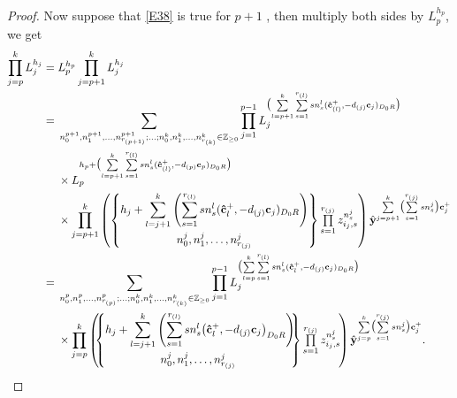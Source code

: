 \documentclass[pdftex]{sigma}
\newcommand{\Z}{\mathbb{Z}}
\numberwithin{equation}{section}
\begin{document}
\begin{proof}
 Now suppose that \eqref{E38} is true for $p+1$ , then multiply both sides by $L_p^{h_p}$, we get
 \begin{align*}
 \prod\limits_{j=p}^{k}L_j^{h_j}
 ={}&L_p^{h_p}\prod\limits_{j=p+1}^{k}L_j^{h_j} \\
={}&\sum_{n_0^{p+1},n_{1}^{p+1},\dots,n_{r_{(p+1)}}^{p+1};\dots;n_0^{k},n_{1}^{k},\dots,n_{r_{(k)}}^k\in \Z_{\geq 0} }\prod_{j=1}^{p-1}L_j^{\bigl(\sum\limits_{l=p+1}^{k}\sum\limits_{s=1}^{r_{(l)}}sn_{s}^{l}(\mathbf{\hat{c}}_{(l)}^+,-d_{(j)}\mathbf{c}_{j})_{D_0R}\bigr)} \\
&\times L_{p}^{h_{p}+\bigl(\sum\limits_{l=p+1}^{k}\sum\limits_{s=1}^{r_{(l)}}sn_{s}^{l}(\mathbf{\hat{c}}_{(l)}^+,-d_{(p)}\mathbf{c}_{p})_{D_0R}\bigr)} \\
&\times \prod\limits_{j=p+1}^{k}\begin{pmatrix}
 \begin{Bmatrix}\displaystyle h_j+\sum\limits_{l=j+1}^{k}\left(\sum\limits_{s=1}^{r_{(l)}}sn_{s}^{l}(\mathbf{\hat{c}}_{l}^+,-d_{(j)}\mathbf{c}_{j})_{D_0R}\right)\vspace{1mm}\\ n_0^j,n_{1}^j,\dots,n_{r_{(j)}}^j\end{Bmatrix}\prod\limits_{s=1}^{r_{(j)}}z_{i_j,s}^{n_s^j}
\end{pmatrix}\hat{\mathbf{y}}^{\sum\limits_{j=p+1}^{k}\bigl(\sum\limits_{s=1}^{r_{(j)}}sn_s^j\bigr)\mathbf{c}_{j}^+}\\
={}&\sum_{n_0^p,n_{1}^{p},\dots,n_{r_{(p)}}^p;\dots;n_0^{k},n_{1}^{k},\dots,n_{r_{(k)}}^k\in \Z_{\geq 0} }\prod_{j=1}^{p-1}L_j^{\bigl(\sum\limits_{l=p}^{k}\sum\limits_{s=1}^{r_{(l)}}s n_{s}^{l}(\mathbf{\hat{c}}_{l}^+,-d_{(j)}\mathbf{c}_{j})_{D_0R}\bigr)} \\
&\times \prod\limits_{j=p}^{k}\begin{pmatrix}\!\!
 \begin{Bmatrix}\displaystyle h_j+\sum\limits_{l=j+1}^{k}\left(\sum\limits_{s=1}^{r_{(l)}}s n_{s}^{l}\bigl(\mathbf{\hat{c}}_{l}^+,-d_{(j)}\mathbf{c}_{j}\bigr)_{D_0R}\right)\!\!\vspace{1mm}\\ n_0^j,n_{1}^j,\dots,n_{r_{(j)}}^j\end{Bmatrix}\prod\limits_{s=1}^{r_{(j)}}z_{i_j,s}^{n_s^j}\!
\end{pmatrix}\hat{\mathbf{y}}^{\sum\limits_{j=p}^{k}\bigl(\sum\limits_{s=1}^{r_{(j)}}s n_s^j\bigr)\mathbf{c}_{j}^+}.\tag*{\qed}
 \end{align*}\renewcommand{\qed}{}
\end{proof}
\end{document}
